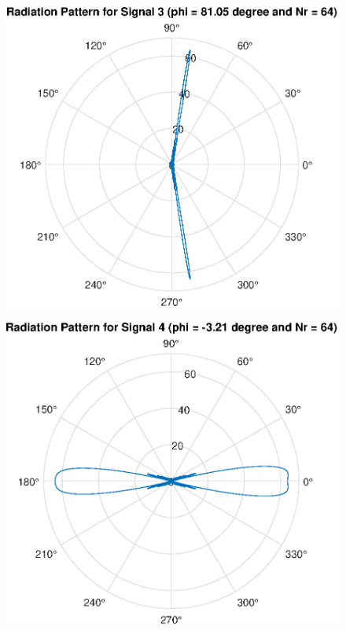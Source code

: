 \begin{figure}[H]
    \centering
    \includegraphics[scale = 0.7]{N64_3.eps}
\end{figure}
\begin{figure}[H]
    \centering
    \includegraphics[scale = 0.7]{N64_4.eps}
\end{figure}
